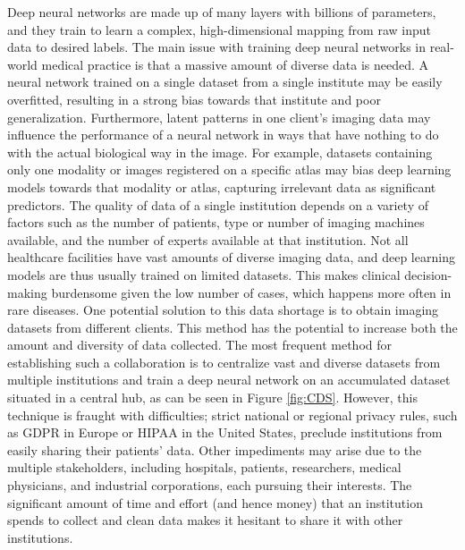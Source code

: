  Deep neural networks are made up of many layers with billions of parameters, and they train to learn a complex, high-dimensional mapping from raw input data to desired labels.\cite{erfani2016high} The main issue with training deep neural networks in real-world medical practice is that a massive amount of diverse data is needed. A neural network trained on a single dataset from a single institute may be easily overfitted, resulting in a strong bias towards that institute and poor generalization. Furthermore, latent patterns in one client's imaging data may influence the performance of a neural network in ways that have nothing to do with the actual biological way in the image. For example, datasets containing only one modality or images registered on a specific atlas may bias deep learning models towards that modality or atlas, capturing irrelevant data as significant predictors. The quality of data of a single institution depends on a variety of factors such as the number of patients, type or number of imaging machines available,  and the number of experts available at that institution. Not all healthcare facilities have vast amounts of diverse imaging data, and deep learning models are thus usually trained on limited datasets. This makes clinical decision-making burdensome given the low number of cases, which happens more often in rare diseases. \newline One potential solution to this data shortage is to obtain imaging datasets from different clients. This method has the potential to increase both the amount and diversity of data collected. The most frequent method for establishing such a  collaboration is to centralize vast and diverse datasets from multiple institutions and train a deep neural network on an accumulated dataset situated in a central hub, as can be seen in Figure \ref{fig:CDS}. However, this technique is fraught with difficulties; strict national or regional privacy rules, such as GDPR in Europe or HIPAA in the United States, preclude institutions from easily sharing their patients' data. Other impediments may arise due to the multiple stakeholders, including hospitals, patients, researchers, medical physicians, and industrial corporations, each pursuing their interests. The significant amount of time and effort (and hence money) that an institution spends to collect and clean data makes it hesitant to share it with other institutions.


